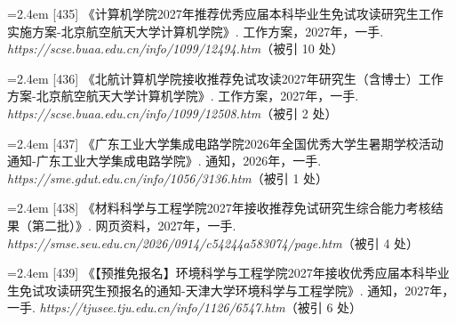 {\vspace{0.6pt}
\vspace{3.5pt}\par
\nopagebreak\vspace{1pt}
\noindent\hangindent=2.4em \label{src:S0579}{\color{cAccent}[435]} 《计算机学院2027年推荐优秀应届本科毕业生免试攻读研究生工作实施方案-北京航空航天大学计算机学院》. 工作方案，2027年，一手. \textit{https://scse.buaa.edu.cn/info/1099/12494.htm}（被引 10 处）\par
\vspace{0.6pt}
\noindent\hangindent=2.4em \label{src:S0580}{\color{cAccent}[436]} 《北航计算机学院接收推荐免试攻读2027年研究生（含博士）工作方案-北京航空航天大学计算机学院》. 工作方案，2027年，一手. \textit{https://scse.buaa.edu.cn/info/1099/12508.htm}（被引 2 处）\par
\vspace{0.6pt}
\vspace{3.5pt}\par
\nopagebreak\vspace{1pt}
\noindent\hangindent=2.4em \label{src:S0584}{\color{cAccent}[437]} 《广东工业大学集成电路学院2026年全国优秀大学生暑期学校活动通知-广东工业大学集成电路学院》. 通知，2026年，一手. \textit{https://sme.gdut.edu.cn/info/1056/3136.htm}（被引 1 处）\par
\vspace{0.6pt}
\vspace{3.5pt}\par
\nopagebreak\vspace{1pt}
\noindent\hangindent=2.4em \label{src:S0585}{\color{cAccent}[438]} 《材料科学与工程学院2027年接收推荐免试研究生综合能力考核结果（第二批）》. 网页资料，2027年，一手. \textit{https://smse.seu.edu.cn/2026/0914/c54244a583074/page.htm}（被引 4 处）\par
\vspace{0.6pt}
\vspace{3.5pt}\par
\nopagebreak\vspace{1pt}
\noindent\hangindent=2.4em \label{src:S0587}{\color{cAccent}[439]} 《【预推免报名】环境科学与工程学院2027年接收优秀应届本科毕业生免试攻读研究生预报名的通知-天津大学环境科学与工程学院》. 通知，2027年，一手. \textit{https://tjusee.tju.edu.cn/info/1126/6547.htm}（被引 6 处）\par
}
